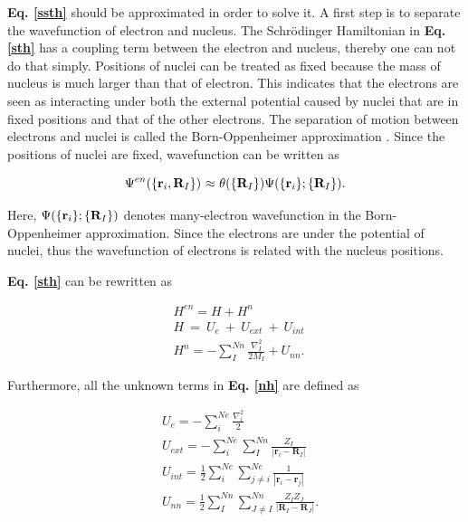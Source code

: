 \documentclass[a4paper, 12pt, titlepage,oneside,drop]{kthesis}
\begin{document}
\textbf{Eq. \ref{ssth}} should be approximated in order to solve it. A first step is to separate the wavefunction of electron and nucleus. The Schrödinger Hamiltonian in \textbf{Eq. \ref{sth}} has a coupling term between
the electron and nucleus, thereby one can not do that simply. Positions of nuclei can be treated as fixed because the mass of nucleus is much larger than that of electron. This indicates that the electrons are seen as interacting under
both the external potential caused by nuclei that are in fixed positions and that of the other electrons. The separation of motion between electrons and nuclei is called the Born-Oppenheimer approximation \cite{bornoppenheimer}.
Since the positions of nuclei are fixed, wavefunction can be written as

\begin{equation}\label{nwf}
{\Psi^{en}(\{ {\textbf r}_{i}, {\textbf R}_{I} \})} \   {\approx} \  {\theta(\{{\textbf R}_{I}\})} {\Psi(\{\textbf{r}_{i}\}; \{{\textbf R}_{I}\})}.
\end{equation}

Here, ${\Psi(\{\textbf{r}_{i}\}; \{{\textbf R}_{I}\})}$ denotes many-electron wavefunction in the Born-Oppenheimer approximation. Since the electrons are under the potential of nuclei, thus the wavefunction of 
electrons is related with the nucleus positions. 
 
\textbf{Eq. \ref{sth}} can be rewritten as

\begin{equation}\begin{split}\label{nh}
& {H^{en}} = H + H^n \\
& {H}\ = \ {U_e} \ + \ {U}_{ext} \ + \ {U}_{int}\  \\
& {H^n} = - \sum\limits_I^{Nn} \frac{{{\nabla}_{{I}}^{2}}}{2 M_{I}} + {{U}_{nn}}.
 \end{split}
\end{equation}

Furthermore, all the unknown terms in \textbf{Eq. \ref{nh}} are defined as

\begin{equation}\begin{split}\label{vext}
& {U_e} = - \sum\limits_i^{{Ne}}   \frac{{{\nabla}_{{i}}^{2}}}{2} \\
& U_{ext} = - \sum\limits_i^{{Ne}} \sum\limits_I^{{Nn}} \frac{Z_{I}}{|\textbf{r}_{i}-\textbf{R}_{I}|} \\
& {U}_{int} =  \frac{1}{2} \sum\limits_i^{{Ne}} \sum\limits_{j \neq i}^{{Ne}} \frac{1}{ |\textbf{r}_{i}-\textbf{r}_{j}|} \\
& {{U}_{nn}} = \frac{1}{2} \sum\limits_I^{{Nn}} \sum\limits_{J \neq I}^{{Nn}} \frac{Z_{I} Z_{J}\ }{|\textbf{R}_{I}-\textbf{R}_{J}|}.
\end{split}
\end{equation}
\end{document}
